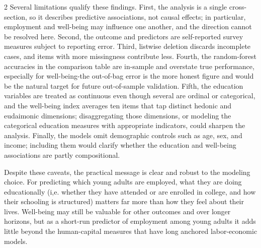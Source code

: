 \documentclass[
  11pt,
]{article}
\begin{document}
\begin{multicols}{2}
Several limitations qualify these findings. First, the analysis is a single cross-section, so it describes predictive associations, not causal effects; in particular, employment and well-being may influence one another, and the direction cannot be resolved here. Second, the outcome and predictors are self-reported survey measures subject to reporting error. Third, listwise deletion discards incomplete cases, and items with more missingness contribute less. Fourth, the random-forest accuracies in the comparison table are in-sample and overstate true performance, especially for well-being-the out-of-bag error is the more honest figure and would be the natural target for future out-of-sample validation. Fifth, the education variables are treated as continuous even though several are ordinal or categorical, and the well-being index averages ten items that tap distinct hedonic and eudaimonic dimensions; disaggregating those dimensions, or modeling the categorical education measures with appropriate indicators, could sharpen the analysis. Finally, the models omit demographic controls such as age, sex, and income; including them would clarify whether the education and well-being associations are partly compositional.

Despite these caveats, the practical message is clear and robust to the modeling choice. For predicting which young adults are employed, what they are doing educationally (i,e. whether they have attended or are enrolled in college, and how their schooling is structured) matters far more than how they feel about their lives. Well-being may still be valuable for other outcomes and over longer horizons, but as a short-run predictor of employment among young adults it adds little beyond the human-capital measures that have long anchored labor-economic models.
\end{multicols}
\end{document}
